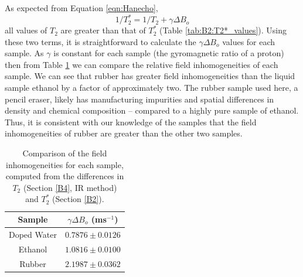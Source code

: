 As expected from Equation \ref{eqn:Hanecho}, 
\[ 1/T^*_2 = 1/T_2 + \gamma \Delta B_o \]
all values of $T_2$ are greater than that of $T_2^*$ (Table \ref{tab:B2:T2*_values}). Using these two terms, it is straightforward to calculate the $\gamma\Delta B_o$ values for each sample. As $\gamma$ is constant for each sample (the gyromagnetic ratio of a proton) then from Table \ref{tab:B5:hom} we can compare the relative field inhomogeneities of each sample. We can see that rubber has greater field inhomogeneities than the liquid sample ethanol by a factor of approximately two. The rubber sample used here, a pencil eraser, likely has manufacturing impurities and spatial differences in density and chemical composition -- compared to a highly pure sample of ethanol. Thus, it is consistent with our knowledge of the samples that the field inhomogeneities of rubber are greater than the other two samples. 
\begin{table}[H]
    \centering
    \begin{tabular}{c|c} \toprule
        \textbf{Sample} & $\gamma \Delta B_o$ (ms$^{-1}$) \\ \midrule
        Doped Water & $0.7876\pm0.0126$ \\
        Ethanol & $1.0816\pm0.0100$ \\
        Rubber & $2.1987\pm0.0362$ \\ \bottomrule
    \end{tabular}
    \caption{Comparison of the field inhomogeneities for each sample, computed from the differences in $T_2$ (Section \ref{B4}, IR method) and $T_2^*$ (Section \ref{B2}).}
    \label{tab:B5:hom}
\end{table}